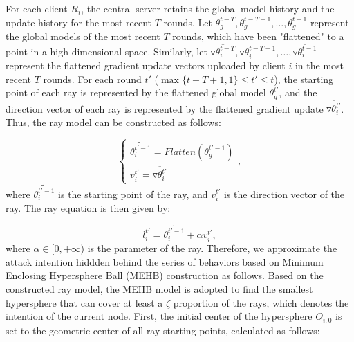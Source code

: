 \documentclass[lettersize,journal]{IEEEtran}
\begin{document}
For each client \(R_i\), the central server retains the global model history and the update history for the most recent \(T\) rounds. Let \( \theta_g^{t-T}, \theta_g^{t-T+1}, \dots, \theta_g^{t-1} \) represent the global models of the most recent \(T\) rounds, which have been "flattened" to a point in a high-dimensional space. Similarly, let \( \overline{\triangledown\theta_{i}^{t-T}}, \overline{\triangledown\theta_{i}^{t-T+1}}, \dots, \overline{\triangledown\theta_{i}^{t-1}} \) represent the flattened gradient update vectors uploaded by client \(i\) in the most recent \(T\) rounds.
For each round \( t' \) (\( \max\{t-T+1, 1\}\leq  t'\leq t \)), the starting point of each ray is represented by the flattened global model \( \theta_g^{t'} \), and the direction vector of each ray is represented by the flattened gradient update \( \overline{\triangledown\theta_{i}^{t'}} \). Thus, the ray model can be constructed as follows:

\begin{equation}
    \left\{\begin{matrix}
    \widetilde{\theta_{i}^{t'-1}} = Flatten(\theta_g^{t'-1})\\
    {v}_{i}^{t'} = \overline{\triangledown\theta_{i}^{t'}}
    \end{matrix}\right.,
\end{equation}
where \( \widetilde{\theta_{i}^{t'-1}} \) is the starting point of the ray, and \( {v}_{i}^{t'} \) is the direction vector of the ray. The ray equation is then given by:

\begin{equation}
l_i^{t'}=\widetilde{\theta_{i}^{t'-1}}+\alpha {v}_{i}^{t'},
\end{equation}
where $\alpha\in [0, +\infty)$ is the parameter of the ray.
Therefore, we approximate the attack intention hiddden behind the series of behaviors based on Minimum Enclosing Hypersphere Ball (MEHB) construction as follows. Based on the constructed ray model, the MEHB model is adopted to find the smallest hypersphere that can cover at least a \( \zeta \) proportion of the rays, which denotes the intention of the current node. First, the initial center of the hypersphere \( O_{i,0} \) is set to the geometric center of all ray starting points, calculated as follows:
\end{document}
